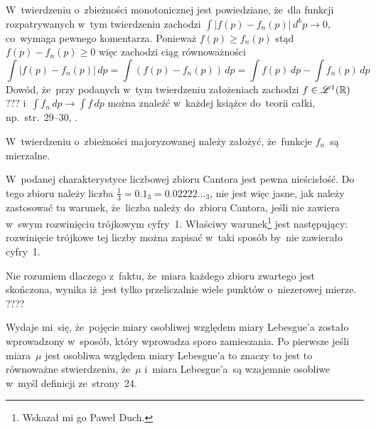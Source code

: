 \documentclass[a4paper,11pt]{article}
\numberwithin{equation}{section}
\begin{document}
\VerSpaceFour





\noindent
{} W~twierdzeniu o~zbieżności monotonicznej jest
powiedziane, że~dla funkcji rozpatrywanych w~tym twierdzeniu zachodzi
$\int | f( p ) - f_{ n }( p ) | \, d^{ k }p \to 0$, co~wymaga pewnego
komentarza. Ponieważ $f( p ) \geq f_{ n }( p )$ stąd
$f( p ) - f_{ n }( p ) \geq 0$ więc zachodzi ciąg równoważności
\begin{equation}
  \label{eq:RS-Vol-I-s01-14}
  \int | f( p ) - f_{ n }( p ) | \, dp
  = \int ( f( p ) - f_{ n }( p ) ) \, dp
  = \int f( p ) \, dp - \int f_{ n }( p ) \, dp
\end{equation}
Dowód, że~przy podanych w~tym twierdzeniu założeniach zachodzi
$f \in \mathcal{L}^{ 1 }( \mathbb{R} )$??? i~$\int f_{ n } \, dp \to \int f \, dp$ można
znaleźć w~każdej książce do~teorii całki, np.~str.~29--30,
\cite{Rudin-Analiza-rzeczywista-i-zespolona-Pub-1986}. %

\VerSpaceFour





\noindent
{} W~twierdzeniu o~zbieżności majoryzowanej należy
założyć, że~funkcje $f_{ n }$~są mierzalne. %

\VerSpaceFour





\noindent
{} W~podanej charakterystyce liczbowej zbioru Cantora
jest pewna nieścisłość. Do tego zbioru należy liczba
$\frac{ 1 }{ 3 } = 0.1_{ 3 } = 0.02222\ldots_{ 3 }$, nie jest więc jasne,
jak należy zastosować tu warunek, że~liczba należy do~zbioru Cantora,
jeśli nie zawiera w~swym rozwinięciu trójkowym cyfry~1. Właściwy
warunek\footnote{Wskazał mi go Paweł Duch.} jest następujący:
rozwinięcie trójkowe tej liczby można zapisać w~taki sposób by~nie
zawierało cyfry~1. %

\VerSpaceFour





\noindent
{} Nie rozumiem dlaczego z~faktu, że~miara każdego zbioru
zwartego jest skończona, wynika iż~jest tylko przeliczalnie wiele
punktów o~niezerowej mierze. ????

\VerSpaceFour





\noindent
{} Wydaje mi~się, że~pojęcie miary osobliwej względem
miary Lebesgue’a zostało wprowadzony w~sposób, który wprowadza sporo
zamieszania. Po pierwsze jeśli miara~$\mu$ jest osobliwa względem
miary Lebesgue’a to znaczy to jest to równoważne stwierdzeniu,
że~$\mu$ i~miara Lebesgue’a~są wzajemnie osobliwe w~myśl definicji
ze~strony~24.
\end{document}
